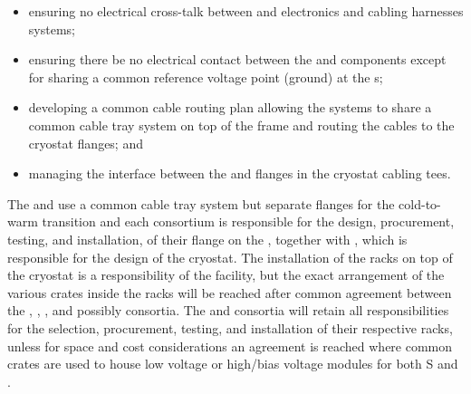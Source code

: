 \begin{itemize}
    \item ensuring no electrical cross-talk between  and  electronics and cabling harnesses systems;
    \item ensuring there be no electrical contact between the  and  components except for sharing a common reference voltage point (ground) at the \fdth{}s;
    \item developing a common cable routing plan allowing the systems to share a common cable tray system on top of the  frame and routing the cables to the cryostat flanges; and 



    \item managing the interface between the  and  flanges in the cryostat cabling tees.
  
  \end{itemize}  
The  and  use a common cable tray system but separate flanges for the cold-to-warm transition and each consortium is responsible for the design, procurement, testing, and installation, of their flange on the \fdth{}, together with , which is responsible for the design of the cryostat. 
The installation of the racks on top of the cryostat is a responsibility of the facility, but the exact arrangement of the various crates inside the racks will be reached after common agreement between the , , , and possibly  consortia. The  and  consortia will retain all responsibilities for the selection, procurement, testing, and installation of their respective racks, unless for space and cost considerations an agreement is reached where common crates are used to house low voltage or high/bias voltage modules for both S and . 



